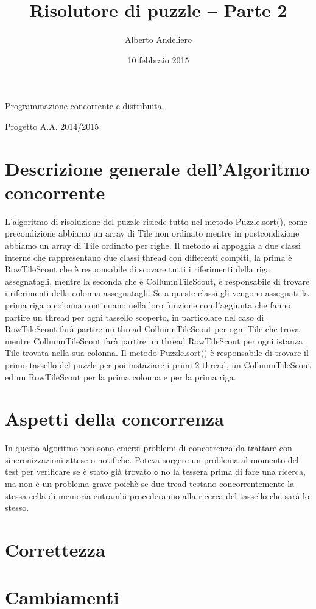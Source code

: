 \documentclass[a4paper]{article}
\title{Risolutore di puzzle – Parte 2}
\author{Alberto Andeliero}
\date{10 febbraio 2015}
\begin{document}
\maketitle
\centerline{Programmazione concorrente e distribuita}
\centerline{Progetto A.A. 2014/2015}

\section{Descrizione generale dell'Algoritmo concorrente}
L'algoritmo di risoluzione del puzzle risiede tutto nel metodo Puzzle.sort(), come precondizione abbiamo un array di Tile non ordinato mentre in postcondizione abbiamo un array di Tile ordinato per righe. Il metodo si appoggia a due classi interne che rappresentano due classi thread con differenti compiti, la prima è RowTileScout che è responsabile di scovare tutti i riferimenti della riga assegnatagli, mentre la seconda che è CollumnTileScout, è responsabile di trovare i riferimenti della colonna assegnatagli. Se a queste classi gli vengono assegnati la prima riga o colonna continuano nella loro funzione con l'aggiunta che fanno partire un thread per ogni tassello scoperto, in particolare nel caso di RowTileScout farà partire un thread CollumnTileScout per ogni Tile che trova mentre CollumnTileScout farà partire un thread RowTileScout per ogni istanza Tile trovata nella sua colonna. Il metodo Puzzle.sort() è responsabile di trovare il primo tassello del puzzle per poi instaziare i primi 2 thread, un CollumnTileScout ed un RowTileScout per la prima colonna e per la prima riga.

\section{Aspetti della concorrenza}
In questo algoritmo non sono emersi problemi di concorrenza da trattare con sincronizzazioni attese o notifiche. Poteva sorgere un problema al momento del test per verificare se è stato già trovato o no la tessera prima di fare una ricerca, ma non è un problema grave poichè se due tread testano concorrentemente la stessa cella di memoria entrambi procederanno alla ricerca del tassello che sarà lo stesso.

\section{Correttezza}

\section{Cambiamenti} 
\end{document}
